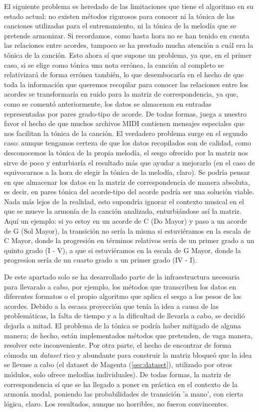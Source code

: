 El siguiente problema es heredado de las limitaciones que tiene el algoritmo en su estado actual: no existen métodos rigurosos para conocer ni la tónica de las canciones utilizadas para el entrenamiento, ni la tónica de la melodía que se pretende armonizar. Si recordamos, como hasta hora no se han tenido en cuenta las relaciones entre acordes, tampoco se ha prestado mucha atención a cuál era la tónica de la canción. Esto ahora sí que supone un problema, ya que, en el primer caso, si se elige como tónica una nota errónea, la canción al completo se relativizará de forma errónea también, lo que desembocaría en el hecho de que toda la información que queremos recopilar para conocer las relaciones entre los acordes se transformaría en ruido para la matriz de correspondencia, ya que, como se comentó anteriormente, los datos se almacenan en entradas representadas por pares grado-tipo de acorde. De todas formas, juega a nuestro favor el hecho de que muchos archivos MIDI contienen mensajes especiales que nos facilitan la tónica de la canción. El verdadero problema surge en el segundo caso: aunque tengamos certeza de que los datos recopilados son de calidad, como desconocemos la tónica de la propia melodía, el sesgo ofrecido por la matriz nos sirve de poco y enturbiaría el resultado más que ayudar a mejorarlo (en el caso de equivocarnos a la hora de elegir la tónica de la melodía, claro). Se podría pensar en que almacenar los datos en la matriz de correspondencia de manera absoluta, es decir, en pares tónica del acorde-tipo del acorde podría ser una solución viable. Nada más lejos de la realidad, esto supondría ignorar el contexto musical en el que se mueve la armonía de la canción analizada, enturbiándose así la matriz. Aquí un ejemplo: si yo estoy en un acorde de C (Do Mayor) y paso a un acorde de G (Sol Mayor), la transición no sería la misma si estuviéramos en la escala de C Mayor, donde la progresión en términos relativos sería de un primer grado a un quinto grado (I - V), a que si estuviéramos en la escala de G Mayor, donde la progresíon sería de un cuarto grado a un primer grado (IV - I).

De este apartado solo se ha desarrollado parte de la infraestructura necesaria para llevaralo a cabo, por ejemplo, los métodos que transcriben los datos en diferentes formatos o el propio algoritmo que aplica el sesgo a los pesos de los acordes. Debido a la escasa proyección que tenía la idea a causa de las problemáticas, la falta de tiempo y a la dificultad de llevarla a cabo, se decidió dejarla a mitad. El problema de la tónica se podría haber mitigado de alguna manera; de hecho, están implementados métodos que pretenden, de vaga manera, resolver este inconveniente. Por otra parte, el hecho de encontrar de forma cómoda un \textit{dataset} rico y abundante para construir la matriz bloqueó que la idea se llevase a cabo (el dataset de Magenta (\ref{sec:dataset}), utilizado por otros módulos, solo ofrece melodías individuales). De todas formas, la matriz de correspondencia sí que se ha llegado a poner en práctica en el contexto de la armonía modal, poniendo las probabilidades de transición 'a mano', con cierta lógica, claro. Los resultados, aunque no horribles, no fueron convincentes.

